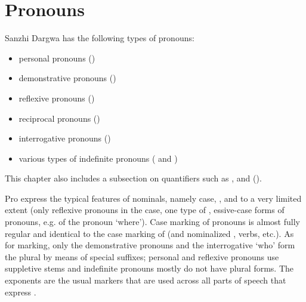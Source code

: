 \chapter{Pronouns}\label{cpt:pronouns}




Sanzhi Dargwa has the following types of pronouns:

\begin{itemize}
	\item	personal pronouns ()
	\item	{}demonstrative pronouns ()
	\item	{}reflexive pronouns ()
	\item	{}reciprocal pronouns ()
	\item	interrogative pronouns ()
	\item	various types of indefinite pronouns ( and )
\end{itemize}
%

This chapter also includes a subsection on quantifiers such as ,  and  (). 

Pro express the typical features of nominals, namely case, , and to a very limited extent  (only reflexive pronouns in the  case, one type of , essive-case forms of pronouns, e.g. of the pronoun `where'). Case marking of pronouns is almost fully regular and identical to the case marking of  (and nominalized , verbs, etc.). As for  marking, only the demonstrative pronouns and the interrogative `who' form the plural by means of special suffixes; personal and reflexive pronouns use suppletive stems and indefinite pronouns mostly do not have plural forms. The  exponents are the usual markers that are used across all parts of speech that express .


